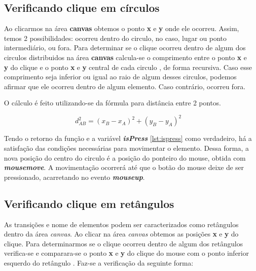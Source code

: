 \documentclass[
	12pt,				%
	openright,			%
	oneside,			%
	a4paper,			%
	english,			%
	brazil				%
	]{abntex2}
\begin{document}
\subsection*{Verificando clique em círculos}

Ao clicarmos na área \textbf{canvas} obtemos o ponto \textbf{x} e \textbf{y} onde ele ocorreu. Assim, temos 2 possibilidades: ocorreu dentro do circulo, no caso, lugar ou ponto intermediário, ou fora. Para determinar se o clique ocorreu dentro de algum dos circulos distribuidos na área \textbf{canvas} calcula-se o comprimento entre o ponto \textbf{x} e \textbf{y} do clique e o ponto \textbf{x} e \textbf{y} central de cada circulo \cite{Macoratti2014}, de forma recursiva. Caso esse comprimento seja inferior ou igual ao raio de algum desses circulos, podemos afirmar que ele ocorreu dentro de algum elemento. Caso contrário, ocorreu fora.

O cálculo é feito utilizando-se da fórmula para distância entre 2 pontos. 

\begin{equation}\label{eq:distancia_entre_pontos}
	d_{AB}^2 = (x_B - x_A)^2 + (y_B - y_A)^2
\end{equation}




Tendo o retorno da função e a variável \textbf{\textit{isPress}} \ref{lst:ispress} como verdadeiro, há a satisfação das condições necessárias para movimentar o elemento. Dessa forma, a nova posição do centro do circulo é a posição do ponteiro do mouse, obtida com \textbf{\textit{mousemove}}. A movimentação ocorrerá até que o botão do mouse deixe de ser pressionado, acarretando no evento \textbf{\textit{mouseup}}. 

\subsection*{Verificando clique em retângulos}

As transições e nome de elementos podem ser caracterizados como retângulos dentro da área \textit{canvas}. Ao clicar na área \textit{canvas} obtemos as posições \textbf{x} e \textbf{y} do clique. Para determinarmos se o clique ocorreu dentro de algum dos retângulos verifica-se e comparara-se o ponto \textbf{x} e \textbf{y} do clique do mouse com o ponto inferior esquerdo do retângulo \cite{Manzoni2013}. Faz-se a verificação da seguinte forma:
\end{document}
